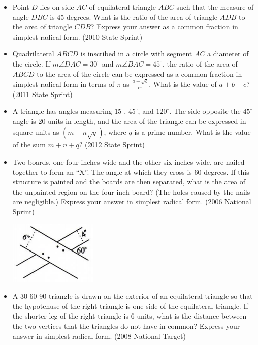 \documentclass{article}
\begin{document}
\begin{itemize}
\item Point $D$ lies on side $AC$ of equilateral triangle $ABC$ such that the measure of angle $DBC$ is 45 degrees. What is the ratio of the area of triangle $ADB$ to the area of triangle $CDB$? Express your answer as a common fraction in simplest radical form. (2010 State Sprint)

\item Quadrilateral $ABCD$ is inscribed in a circle with segment $AC$ a diameter of the circle. If $m\angle DAC=30^\circ$ and $m\angle BAC=45^\circ$, the ratio of the area of $ABCD$ to the area of the circle can be expressed as a common fraction in simplest radical form in terms of $\pi$ as $\frac{a+\sqrt{b}}{c\pi}$. What is the value of $a+b+c$? (2011 State Sprint)

\item A triangle has angles measuring $15^\circ$, $45^\circ$, and $120^\circ$. The side opposite the $45^\circ$ angle is 20 units in length, and the area of the triangle can be expressed in square units as $(m-n\sqrt{q})$, where $q$ is a prime number. What is the value of the sum $m+n+q$? (2012 State Sprint)

\item Two boards, one four inches wide and the other six inches wide, are nailed together to form an ``X''. The angle at which they cross is 60 degrees. If this structure is painted and the boards are then separated, what is the area of the unpainted region on the four-inch board? (The holes caused by the nails are negligible.) Express your answer in simplest radical form. (2006 National Sprint)

\centerline{\includegraphics{2006NatSprint.png}}

\item A 30-60-90 triangle is drawn on the exterior of an equilateral triangle so that the hypotenuse of the right triangle is one side of the equilateral triangle. If the shorter leg of the right triangle is 6 units, what is the distance between the two vertices that the triangles do not have in common? Express your answer in simplest radical form. (2008 National Target)


\end{itemize}
\end{document}
